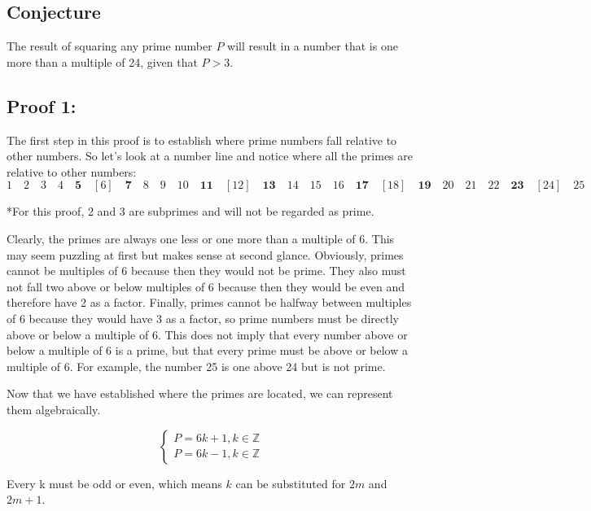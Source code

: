 
\subsection*{Conjecture}

The result of squaring any prime number \(P\) will result in a number that is one more than a multiple of 24, given that \(P > 3\).

\subsection*{Proof 1:}

The first step in this proof is to establish where prime numbers fall relative to other numbers. So let’s look at a number line and notice where all the primes are relative to other numbers:
\[1  \quad 2 \quad 3 \quad 4 \quad \textbf{5} \quad [6] \quad \textbf{7} \quad 8 \quad 9 \quad 10 \quad \textbf{11} \quad [12] \quad \textbf{13} \quad 14 \quad 15 \quad 16 \quad \textbf{17} \quad [18] \quad \textbf{19} \quad 20 \quad 21 \quad 22 \quad \textbf{23} \quad [24] \quad 25\]

*For this proof, 2 and 3 are subprimes and will not be regarded as prime.

Clearly, the primes are always one less or one more than a multiple of 6. This may seem puzzling at first but makes sense at second glance. Obviously, primes cannot be multiples of 6 because then they would not be prime. They also must not fall two above or below multiples of 6 because then they would be even and therefore have 2 as a factor. Finally, primes cannot be halfway between multiples of 6 because they would have 3 as a factor, so prime numbers must be directly above or below a multiple of 6. This does not imply that every number above or below a multiple of 6 is a prime, but that every prime must be above or below a multiple of 6. For example, the number 25 is one above 24 but is not prime. 

Now that we have established where the primes are located, we can represent them algebraically.


\[
    \begin{cases}
    P = 6k + 1, k \in \mathbb{Z} \\
    P = 6k - 1, k \in \mathbb{Z}
    \end{cases}
\]

Every k must be odd or even, which means \(k\) can be substituted for \(2m\) and \(2m +1\).

